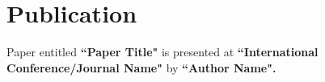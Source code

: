\section{Publication}

Paper entitled \textbf{``Paper Title"} is presented at \textbf{``International Conference/Journal Name"} by \textbf{``Author Name".}\\
